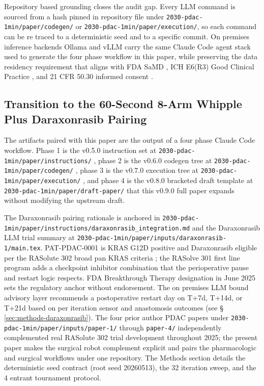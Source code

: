 Repository based grounding closes the audit gap. Every LLM command
is sourced from a hash pinned in repository file under
\texttt{2030-pdac-1min/paper/codegen/} or
\texttt{2030-pdac-1min/paper/execution/}, so each command can be
re traced to a deterministic seed and to a specific commit.
On premises inference backends Ollama \cite{ollama} and vLLM
\cite{vllm} carry the same Claude Code agent stack
\cite{claude-code, claude-opus-47, claude-sonnet-46} used to
generate the four phase workflow in this paper, while preserving
the data residency requirement that aligns with FDA SaMD
\cite{fda-samd}, ICH E6(R3) Good Clinical Practice
\cite{ich-e6r3}, and 21 CFR 50.30 informed consent
\cite{cfr-21-50-30}.

\subsection{Transition to the 60-Second 8-Arm Whipple Plus Daraxonrasib Pairing}
\label{sec:intro-transition}

The artifacts paired with this paper are the output of a four
phase Claude Code workflow. Phase 1 is the v0.5.0 instruction set
at \texttt{2030-pdac-1min/paper/instructions/}
\cite{pdac-instructions-v050}, phase 2 is the v0.6.0 codegen tree
at \texttt{2030-pdac-1min/paper/codegen/}
\cite{pdac-codegen-v060}, phase 3 is the v0.7.0 execution tree at
\texttt{2030-pdac-1min/paper/execution/}
\cite{pdac-execution-v070}, and phase 4 is the v0.8.0 bracketed
draft template at \texttt{2030-pdac-1min/paper/draft-paper/}
\cite{pdac-draft-paper-v080} that this v0.9.0 full paper expands
without modifying the upstream draft.

The Daraxonrasib pairing rationale is anchored in
\texttt{2030-pdac-1min/paper/instructions/daraxonrasib_integration.md}
and the Daraxonrasib LLM trial summary
\cite{kawchak_2025_18099351} at
\texttt{2030-pdac-1min/paper/inputs/daraxonrasib-1/main.tex}.
PAT-PDAC-0001 is KRAS G12D positive and Daraxonrasib eligible per
the RASolute 302 broad pan KRAS criteria \cite{rasolute302}; the
RASolve 301 first line program \cite{rasolve301} adds a checkpoint
inhibitor combination that the perioperative pause and restart
logic respects. FDA Breakthrough Therapy designation in June 2025
\cite{rev-fda-breakthrough} sets the regulatory anchor without
endorsement. The on premises LLM bound advisory layer recommends a
postoperative restart day on T+7d, T+14d, or T+21d based on per
iteration sensor and anastomosis outcomes (see \S
\ref{sec:methods-daraxonrasib}). The four prior author PDAC papers
under \texttt{2030-pdac-1min/paper/inputs/paper-1/} through
\texttt{paper-4/} \cite{kawchak_2025_15735068,
kawchak_2025_16415815, kawchak_2025_17001137,
kawchak_2025_17239510} independently complemented real RASolute
302 trial development throughout 2025; the present paper makes the
surgical robot complement explicit and pairs the pharmacologic and
surgical workflows under one repository. The Methods section
details the deterministic seed contract (root seed 20260513), the
32 iteration sweep, and the 4 entrant tournament protocol.
